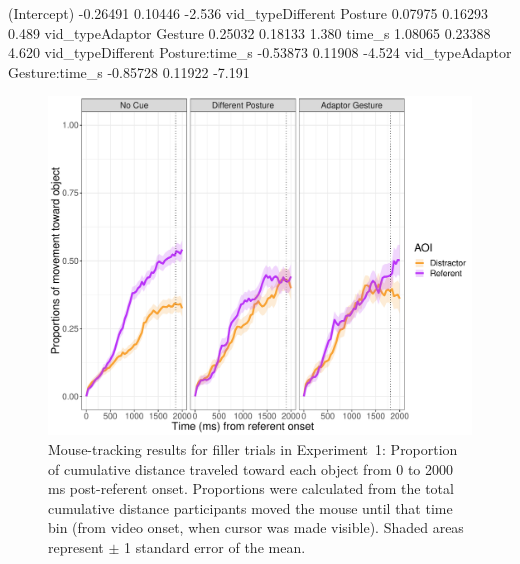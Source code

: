 \documentclass[a4paper,man,natbib]{apa6}
\begin{document}
(Intercept)                      -0.26491    0.10446  -2.536
vid_typeDifferent Posture         0.07975    0.16293   0.489
vid_typeAdaptor Gesture           0.25032    0.18133   1.380
time_s                            1.08065    0.23388   4.620
vid_typeDifferent Posture:time_s -0.53873    0.11908  -4.524
vid_typeAdaptor Gesture:time_s   -0.85728    0.11922  -7.191

\begin{figure}[Ht]
  \centering
	\includegraphics[width=\linewidth]{./img/e7_mouse_filler.pdf}
  \caption{Mouse-tracking results for filler trials in Experiment~1: Proportion of cumulative distance traveled toward each object from 0 to 2000 ms post-referent onset. Proportions were calculated from the total cumulative distance participants moved the mouse until that time bin (from video onset, when cursor was made visible). Shaded areas represent $\pm$ 1 standard error of the mean.}
  \label{fig:v1_mouse2}
\end{figure}
\end{document}
